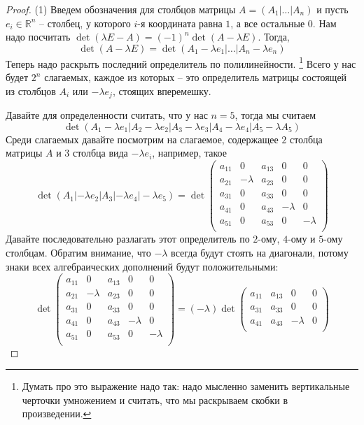 \begin{proof}
(1) Введем обозначения для столбцов матрицы $A = (A_1|\ldots|A_n)$ и пусть $e_i\in\mathbb R^n$ -- столбец, у которого $i$-я координата равна $1$, а все остальные $0$.
Нам надо посчитать $\det(\lambda E - A) = (-1)^n \det(A-\lambda E)$.
Тогда, 
\[
\det(A-\lambda E) = \det(A_1 - \lambda e_1|\ldots|A_n - \lambda e_n)
\]
Теперь надо раскрыть последний определитель по полилинейности.%
\footnote{Думать про это выражение надо так: надо мысленно заменить вертикальные черточки умножением и считать, что мы раскрываем скобки в произведении.}
Всего у нас будет $2^n$ слагаемых, каждое из которых -- это определитель матрицы состоящей из столбцов $A_i$ или $-\lambda e_j$, стоящих вперемешку.

Давайте для определенности считать, что у нас $n=5$, тогда мы считаем
\[
\det(A_1-\lambda e_1|A_2-\lambda e_2|A_3 - \lambda e_3|A_4 -\lambda e_4|A_5 - \lambda A_5)
\]
Среди слагаемых давайте посмотрим на слагаемое, содержащее $2$ столбца матрицы $A$ и $3$ столбца вида $-\lambda e_i$, например, такое
\[
\det(A_1|-\lambda e_2|A_3|-\lambda e_4|-\lambda e_5) = 
\det
\begin{pmatrix}
{a_{11}}&{0}&{a_{13}}&{0}&{0}\\
{a_{21}}&{-\lambda}&{a_{23}}&{0}&{0}\\
{a_{31}}&{0}&{a_{33}}&{0}&{0}\\
{a_{41}}&{0}&{a_{43}}&{-\lambda}&{0}\\
{a_{51}}&{0}&{a_{53}}&{0}&{-\lambda}\\
\end{pmatrix}
\]
Давайте последовательно разлагать этот определитель по $2$-ому, $4$-ому и $5$-ому столбцам.
Обратим внимание, что $-\lambda$ всегда будут стоять на диагонали, потому знаки всех алгебраических дополнений будут положительными:
\[
\det
\begin{pmatrix}
{a_{11}}&{0}&{a_{13}}&{0}&{0}\\
{a_{21}}&{-\lambda}&{a_{23}}&{0}&{0}\\
{a_{31}}&{0}&{a_{33}}&{0}&{0}\\
{a_{41}}&{0}&{a_{43}}&{-\lambda}&{0}\\
{a_{51}}&{0}&{a_{53}}&{0}&{-\lambda}\\
\end{pmatrix}
=
(-\lambda)
\det
\begin{pmatrix}
{a_{11}}&{a_{13}}&{0}&{0}\\
{a_{31}}&{a_{33}}&{0}&{0}\\
{a_{41}}&{a_{43}}&{-\lambda}&{0}\\

\end{pmatrix}\]
\end{proof}
